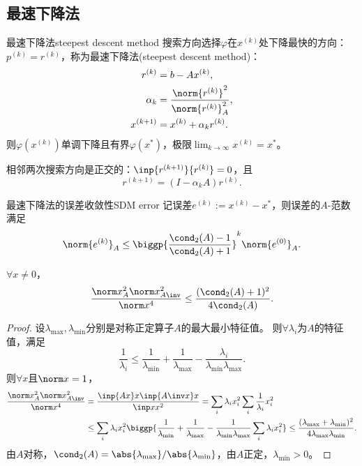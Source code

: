 \subsection{最速下降法}
\label{ssec:steepest descent method}

\begin{theorem}
    {最速下降法}{steepest descent method}
    搜索方向选择$\varphi$在$x^{(k)}$处下降最快的方向：$p^{(k)}=r^{(k)}$，称为最速下降法(steepest descent method)：
    \begin{subequations}
        \begin{align}
            r^{(k)}&=b-Ax^{(k)},\\
            \alpha_k&=\frac{\norm{r^{(k)}}^2}{\norm{r^{(k)}}_A^2},\\
            x^{(k+1)}&=x^{(k)}+\alpha_kr^{(k)}.
        \end{align}
    \end{subequations}
    则$\varphi(x^{(k)})$单调下降且有界$\varphi(x^*)$，极限$\lim_{k\to\infty}x^{(k)}=x^*$。
\end{theorem}

\begin{corollary}
    相邻两次搜索方向是正交的：$\inp{r^{(k+1)}}{r^{(k)}}=0$，且
    \[
        r^{(k+1)}=(I-\alpha_k A)r^{(k)}.
    \]
\end{corollary}

\begin{theorem}
    {最速下降法的误差收敛性}{SDM error}
    记误差$e^{(k)}:=x^{(k)}-x^*$，则误差的$A$-范数满足
    \begin{equation}
        \label{eqn:SDM e^k}
        \norm{e^{(k)}}_A\leq\biggp{\frac{\cond_2(A)-1}{\cond_2(A)+1}}^k\norm{e^{(0)}}_A.
    \end{equation}
\end{theorem}

\begin{lemma}
    $\forall x\neq 0$，
    \begin{equation}
        \frac{\norm x_A^2\norm x_{A\inv}^2}{\norm x^4}\leq\frac{(\cond_2(A)+1)^2}{4\cond_2(A)}.
    \end{equation}
\end{lemma}

\begin{proof}
    设$\lambda_{\max},\lambda_{\min}$分别是对称正定算子$A$的最大最小特征值。
    则$\forall\lambda_i$为$A$的特征值，满足
    \[
        \frac1{\lambda_i}\leq\frac1{\lambda_{\min}}+\frac1{\lambda_{\max}}-\frac{\lambda_i}{\lambda_{\min}\lambda_{\max}}.
    \]
    则$\forall x$且$\norm x=1$，
    \begin{align*}
        \frac{\norm x_A^2\norm x_{A\inv}^2}{\norm x^4}&=\frac{\inp{Ax}x\inp{A\inv x}x}{\inp xx^2}=\sum_i\lambda_ix_i^2\sum_i\frac1{\lambda_i}x_i^2\\
        &\leq\sum_i\lambda_ix_i^2\biggp{\frac1{\lambda_{\min}}+\frac1{\lambda_{\max}}-\frac1{\lambda_{\min}\lambda_{\max}}\sum_i\lambda_ix_i^2}\leq\frac{(\lambda_{\max}+\lambda_{\min})^2}{4\lambda_{\max}\lambda_{\min}}.
    \end{align*}
    由$A$对称，$\cond_2(A)=\abs{\lambda_{\max}}/\abs{\lambda_{\min}}$，由$A$正定，$\lambda_{\min}>0$。
\end{proof}

